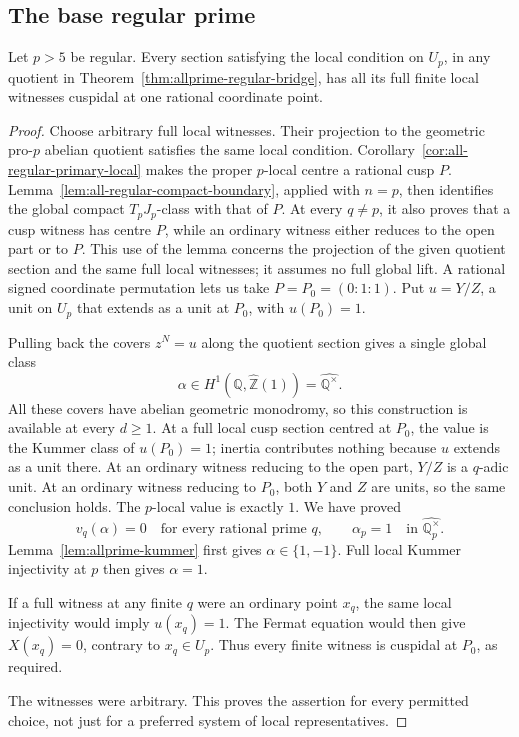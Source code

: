 \subsection{The base regular prime}

\begin{proposition}
\label{prop:allprime-base-regular}
Let \(p>5\) be regular.  Every section satisfying the local
condition on \(U_p\), in any quotient in
Theorem~\ref{thm:allprime-regular-bridge}, has all its full finite
local witnesses cuspidal at one rational coordinate point.
\end{proposition}

\begin{proof}
Choose arbitrary full local witnesses. Their projection to the
geometric pro-\(p\) abelian quotient satisfies the same local
condition. Corollary~\ref{cor:all-regular-primary-local} makes the
proper \(p\)-local centre a rational cusp \(P\).
Lemma~\ref{lem:all-regular-compact-boundary}, applied with \(n=p\),
then identifies the global compact \(T_pJ_p\)-class with that of
\(P\). At every \(q\ne p\), it also proves that a cusp witness
has centre \(P\), while an ordinary witness either reduces to
the open part or to \(P\). This use of the lemma concerns the
projection of the given quotient section and the same full
local witnesses; it assumes no full global lift.
A rational signed coordinate permutation lets us take
\(P=P_0=(0:1:1)\).
Put \(u=Y/Z\), a unit on \(U_p\) that extends as a unit at
\(P_0\), with \(u(P_0)=1\).

Pulling back the covers \(z^N=u\) along the quotient section
gives a single global class
\[
 \alpha\in H^1(\mathbb Q,\widehat{\mathbb Z}(1))
        =\widehat{\mathbb Q^\times}.
\]
All these covers have abelian geometric monodromy, so this
construction is available at every \(d\geq1\).
At a full local cusp section centred at \(P_0\), the value is
the Kummer class of \(u(P_0)=1\); inertia contributes nothing
because \(u\) extends as a unit there.
At an ordinary witness reducing to the open part, \(Y/Z\) is
a \(q\)-adic unit.
At an ordinary witness reducing to \(P_0\), both \(Y\) and \(Z\)
are units, so the same conclusion holds.
The \(p\)-local value is exactly \(1\).
We have proved
\[
 v_q(\alpha)=0\quad\text{for every rational prime }q,
 \qquad \alpha_p=1
 \quad\text{in }\widehat{\mathbb Q_p^\times}.
\]
Lemma~\ref{lem:allprime-kummer} first gives \(\alpha\in\{1,-1\}\).
Full local Kummer injectivity at \(p\) then gives \(\alpha=1\).

If a full witness at any finite \(q\) were an ordinary point
\(x_q\), the same local injectivity would imply
\(u(x_q)=1\).
The Fermat equation would then give \(X(x_q)=0\), contrary to
\(x_q\in U_p\).
Thus every finite witness is cuspidal at \(P_0\), as required.

The witnesses were arbitrary.  This proves the assertion for
every permitted choice, not just for a preferred system of
local representatives.
\end{proof}


